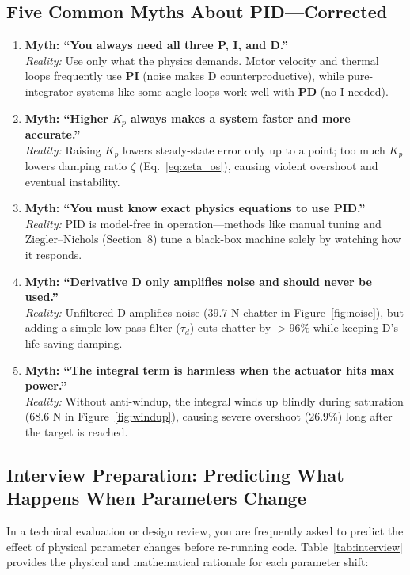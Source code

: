 \documentclass[10pt,a4paper]{article}
\begin{document}
\newpage
\subsection*{Five Common Myths About PID---Corrected}
\begin{enumerate}
  \item \textbf{Myth: ``You always need all three P, I, and D.''} \\
  \textit{Reality:} Use only what the physics demands. Motor velocity and thermal loops frequently use \textbf{PI} (noise makes D counterproductive), while pure-integrator systems like some angle loops work well with \textbf{PD} (no I needed).
  \item \textbf{Myth: ``Higher $K_p$ always makes a system faster and more accurate.''} \\
  \textit{Reality:} Raising $K_p$ lowers steady-state error only up to a point; too much $K_p$ lowers damping ratio $\zeta$ (Eq.~\eqref{eq:zeta_os}), causing violent overshoot and eventual instability.
  \item \textbf{Myth: ``You must know exact physics equations to use PID.''} \\
  \textit{Reality:} PID is model-free in operation---methods like manual tuning and Ziegler--Nichols (Section~8) tune a black-box machine solely by watching how it responds.
  \item \textbf{Myth: ``Derivative D only amplifies noise and should never be used.''} \\
  \textit{Reality:} Unfiltered D amplifies noise ($39.7\text{ N}$ chatter in Figure~\ref{fig:noise}), but adding a simple low-pass filter ($\tau_d$) cuts chatter by $>96\%$ while keeping D's life-saving damping.
  \item \textbf{Myth: ``The integral term is harmless when the actuator hits max power.''} \\
  \textit{Reality:} Without anti-windup, the integral winds up blindly during saturation ($68.6\text{ N}$ in Figure~\ref{fig:windup}), causing severe overshoot ($26.9\%$) long after the target is reached.
\end{enumerate}

\subsection*{Interview Preparation: Predicting What Happens When Parameters Change}
In a technical evaluation or design review, you are frequently asked to predict the effect of physical parameter changes before re-running code. Table~\ref{tab:interview} provides the physical and mathematical rationale for each parameter shift:
\end{document}
